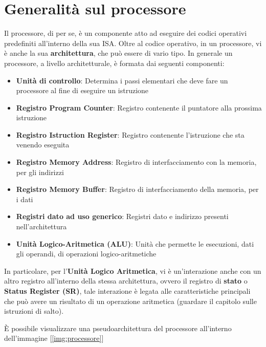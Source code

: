 \section{Generalità sul processore}
Il processore, di per se, è un componente atto ad eseguire dei codici operativi predefiniti all'interno della sua ISA.
Oltre al codice operativo, in un processore, vi è anche la sua \textbf{architettura}, che può essere di vario tipo. In generale un processore, a livello architetturale, è formata dai seguenti componenti:
\begin{itemize}
    \item \textbf{Unità di controllo}: Determina i passi elementari che deve fare un processore al fine di eseguire un istruzione
    \item \textbf{Registro Program Counter}: Registro contenente il puntatore alla prossima istruzione
    \item \textbf{Registro Istruction Register}: Registro contenente l'istruzione che sta venendo eseguita
    \item \textbf{Registro Memory Address}: Registro di interfacciamento con la memoria, per gli indirizzi
    \item \textbf{Registro Memory Buffer}: Registro di interfacciamento della memoria, per i dati
    \item \textbf{Registri dato ad uso generico}: Registri dato e indirizzo presenti nell'architettura
    \item \textbf{Unità Logico-Aritmetica (ALU)}: Unità che permette le esecuzioni, dati gli operandi, di operazioni logico-aritmetiche
\end{itemize}

In particolare, per l'\textbf{Unità Logico Aritmetica}, vi è un'interazione anche con un altro registro all'interno della stessa architettura, ovvero il registro di \textbf{stato} o \textbf{Status Register (SR)}, tale interazione è legata alle caratteristiche principali che può avere un risultato di un operazione aritmetica (guardare il capitolo sulle istruzioni di salto).

\uppercase{è} possibile visualizzare una pseudoarchitettura del processore all'interno dell'immagine [\ref{img:processore}]

